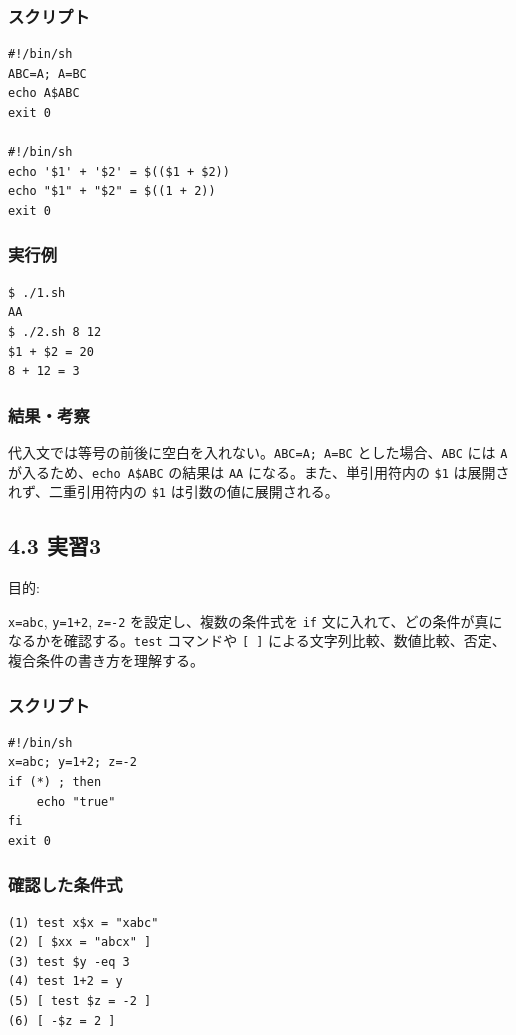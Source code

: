 \documentclass[12pt,a4paper]{jsarticle}
\begin{document}
\subsubsection*{スクリプト}
\begin{lstlisting}
#!/bin/sh
ABC=A; A=BC
echo A$ABC
exit 0

#!/bin/sh
echo '$1' + '$2' = $(($1 + $2))
echo "$1" + "$2" = $((1 + 2))
exit 0
\end{lstlisting}

\subsubsection*{実行例}
\begin{lstlisting}
$ ./1.sh
AA
$ ./2.sh 8 12
$1 + $2 = 20
8 + 12 = 3
\end{lstlisting}

\subsubsection*{結果・考察}
代入文では等号の前後に空白を入れない。\texttt{ABC=A; A=BC} とした場合、\texttt{ABC} には \texttt{A} が入るため、\texttt{echo A\$ABC} の結果は \texttt{AA} になる。また、単引用符内の \texttt{\$1} は展開されず、二重引用符内の \texttt{\$1} は引数の値に展開される。\par

\vspace{1.0cm}

\subsection*{4.3 実習3}

目的:\par
\texttt{x=abc}, \texttt{y=1+2}, \texttt{z=-2} を設定し、複数の条件式を \texttt{if} 文に入れて、どの条件が真になるかを確認する。\texttt{test} コマンドや \texttt{[ ]} による文字列比較、数値比較、否定、複合条件の書き方を理解する。

\subsubsection*{スクリプト}
\begin{lstlisting}
#!/bin/sh
x=abc; y=1+2; z=-2
if (*) ; then
    echo "true"
fi
exit 0
\end{lstlisting}

\subsubsection*{確認した条件式}
\begin{lstlisting}
(1) test x$x = "xabc"
(2) [ $xx = "abcx" ]
(3) test $y -eq 3
(4) test 1+2 = y
(5) [ test $z = -2 ]
(6) [ -$z = 2 ]
\end{lstlisting}
\end{document}
